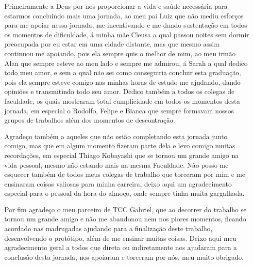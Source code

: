 \begin{agradecimentos}
Primeiramente a Deus por nos proporcionar a vida e saúde necessária para estarmos concluindo mais uma jornada, ao meu pai Luiz que não mediu esforços para me apoiar nessa jornada, me incentivando e me dando sustentação em todos os momentos de dificuldade, á minha mãe Cleusa a qual passou noites sem dormir preocupada por eu estar em uma cidade distante, mas que mesmo assim continuou me apoiando, pois ela sempre quis o melhor de mim, ao meu irmão Alan que sempre esteve ao meu lado e sempre me admirou, á Sarah a qual dedico todo meu amor, e sem a qual não sei como conseguiria concluir esta graduação, pois ela sempre esteve comigo nas minhas horas de estudo me ajudando, dando opiniões e transmitindo todo seu amor. Dedico também a todos os colegas de faculdade, os quais mostraram total cumplicidade em todos os momentos desta jornada, em especial o Rodolfo, Felipe e Bianca que sempre formavam nossos grupos de trabalhos além dos momentos de descontração.

Agradeço também a aqueles que não estão completando esta jornada junto comigo, mas que em algum momento fizeram parte dela e levo comigo muitas recordações, em especial Thiago Kobayashi que se tornou um grande amigo na vida pessoal, mesmo não estando mais na mesma Faculdade. Não posso me esquecer também de todos meus colegas de trabalho que torceram por mim e me ensinaram coisas valiosas para minha carreira, deixo aqui um agradecimento especial para o pessoal da hora do almoço, onde sempre tinha muita gargalhada.

Por fim agradeço o meu parceiro de TCC Gabriel, que ao decorrer do trabalho se tornou um grande amigo e não me abandonou nem nos piores momentos, ficando acordado nas madrugadas ajudando para a finalização deste trabalho, desenvolvendo o protótipo, além de me ensinar muitas coisas. Deixo aqui meu agradecimento geral a todos que direta ou indiretamente nos ajudaram para a conclusão desta jornada, nos apoiaram e torceram por nós, meu muito obrigado.
\end{agradecimentos}